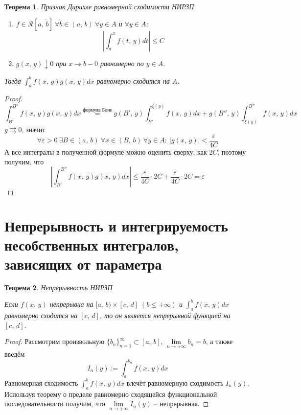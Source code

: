 \documentclass[a4paper,12pt]{article}
\renewcommand{\leq}{\ensuremath{\leqslant}}
\theoremstyle{plain}
\newtheorem{theorem}{Теорема}[section]
\theoremstyle{definition}
\theoremstyle{remark}
\begin{document}
\begin{theorem}
	Признак Дирихле равномерной сходимости НИРЗП.

	\begin{enumerate}
		\item $f \in \mathcal{R}[a,\,\tilde{b}]\:\forall \tilde{b} \in (a,\,b) \: \forall y \in A$ и $\forall y \in A$:
		      \[\left|\int_a^x f(t,\,y)dt\right| \leq C\]
		\item $g(x,\,y) \downarrow 0$ при $x \to b - 0$ равномерно по $y \in A$.
	\end{enumerate}
	Тогда $\int_a^b f(x,\,y)g(x,\,y)dx$ равномерно сходится на $A$.
\end{theorem}
\begin{proof}
	\[\int_{B'}^{B''}f(x,\,y)g(x,\,y)dx \stackrel{\text{формула Боне}}{=} g(B',\,y)\int_{B'}^{\xi(y)}f(x,\,y)dx + g(B'',\,y)\int_{\xi(y)}^{B''}f(x,\,y)dx\]
	$g \rightrightarrows 0$, значит
	\[\forall \varepsilon > 0 \: \exists B \in (a,\,b) \: \forall x \in (B,\,b) \: \forall y \in A :\: |g(x,\,y)| < \frac{\varepsilon}{4C}\]
	А все интегралы в полученной формуле можно оценить сверху, как $2C$, поэтому получим, что
	\[\left|\int_{B'}^{B''}f(x,\,y)g(x,\,y)dx\right| \leq \frac{\varepsilon}{4C}\cdot 2C + \frac{\varepsilon}{4C}\cdot 2C = \varepsilon\]
\end{proof}

\section{Непрерывность и интегрируемость несобственных интегралов, зависящих от параметра}
\begin{theorem}
	Непрерывность НИРЗП

	Если $f(x,\,y)$ непрерывна на $[a,\,b) \times [c,\,d]\; (b \leq +\infty)$ и $\int_a^bf(x,\,y)dx$ равномерно сходится на $[c,\,d]$, то он является непрерывной функцией на $[c,\,d]$.
\end{theorem}
\begin{proof}
	Рассмотрим произвольную $\{b_n\}_{n = 1}^\infty \subset [a,\,b],\,\lim\limits_{n \to +\infty}b_n = b$, а также введём
	\[I_n(y) := \int_a^{b_n}f(x,\,y)dx\]
	Равномерная сходимость $\int_a^bf(x,\,y)dx$ влечёт равномерную сходимость $I_n(y)$. Используя теорему о пределе равномерно сходящейся функциональной последовательности получим, что $\lim\limits_{n \to +\infty} I_n(y)$ -- непрерывная.
\end{proof}
\end{document}
